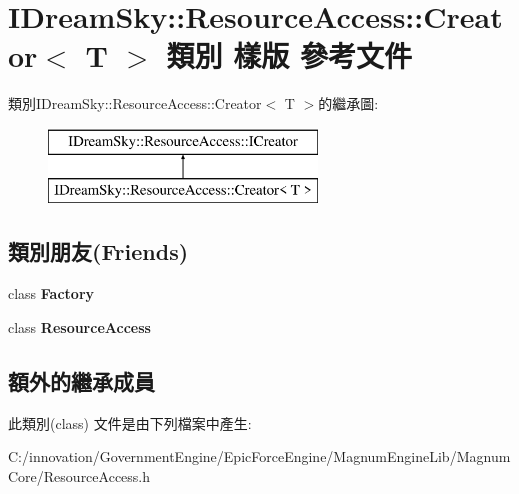 \hypertarget{class_i_dream_sky_1_1_resource_access_1_1_creator}{}\section{I\+Dream\+Sky\+:\+:Resource\+Access\+:\+:Creator$<$ T $>$ 類別 樣版 參考文件}
\label{class_i_dream_sky_1_1_resource_access_1_1_creator}
類別\+I\+Dream\+Sky\+:\+:Resource\+Access\+:\+:Creator$<$ T $>$的繼承圖\+:\begin{figure}[H]
\begin{center}
\leavevmode
\includegraphics[height=2.000000cm]{class_i_dream_sky_1_1_resource_access_1_1_creator}
\end{center}
\end{figure}
\subsection*{類別朋友(Friends)}
\begin{DoxyCompactItemize}
\item 
class {\bfseries Factory}\hypertarget{class_i_dream_sky_1_1_resource_access_1_1_creator_a328c093d609680cca505905c6d49901a}{}\label{class_i_dream_sky_1_1_resource_access_1_1_creator_a328c093d609680cca505905c6d49901a}

\item 
class {\bfseries Resource\+Access}\hypertarget{class_i_dream_sky_1_1_resource_access_1_1_creator_a3a26a4a200b91c31f27b5e173018a17c}{}\label{class_i_dream_sky_1_1_resource_access_1_1_creator_a3a26a4a200b91c31f27b5e173018a17c}

\end{DoxyCompactItemize}
\subsection*{額外的繼承成員}


此類別(class) 文件是由下列檔案中產生\+:\begin{DoxyCompactItemize}
\item 
C\+:/innovation/\+Government\+Engine/\+Epic\+Force\+Engine/\+Magnum\+Engine\+Lib/\+Magnum\+Core/Resource\+Access.\+h\end{DoxyCompactItemize}
